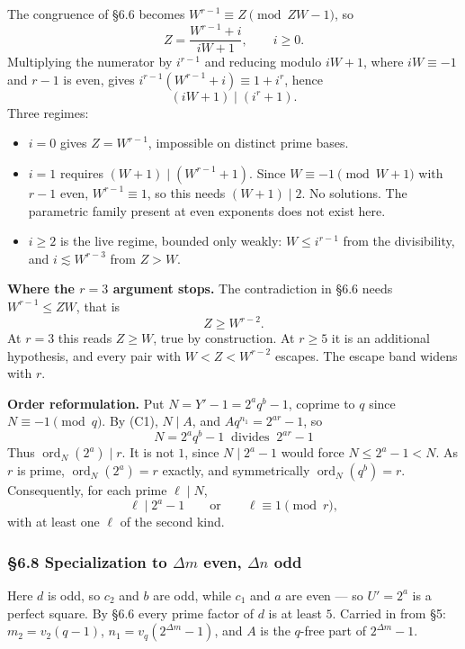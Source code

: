 \documentclass[11pt]{article}
\begin{document}
The congruence of \S6.6 becomes $W^{r-1} \equiv Z \pmod{ZW-1}$, so
\[
Z = \frac{W^{r-1}+i}{iW+1}, \qquad i \geq 0 .
\]
Multiplying the numerator by $i^{r-1}$ and reducing modulo $iW+1$, where $iW \equiv -1$ and $r-1$ is even, gives $i^{r-1}\left(W^{r-1}+i\right) \equiv 1 + i^{r}$, hence
\[
(iW+1) \mid \left(i^{r}+1\right).
\]
Three regimes:
\begin{itemize}
\item $i = 0$ gives $Z = W^{r-1}$, impossible on distinct prime bases.
\item $i = 1$ requires $(W+1) \mid \left(W^{r-1}+1\right)$. Since $W \equiv -1 \pmod{W+1}$ with $r-1$ even, $W^{r-1} \equiv 1$, so this needs $(W+1) \mid 2$. No solutions. The parametric family present at even exponents does not exist here.
\item $i \geq 2$ is the live regime, bounded only weakly: $W \leq i^{r-1}$ from the divisibility, and $i \lesssim W^{r-3}$ from $Z > W$.
\end{itemize}

\medskip
\noindent\textbf{Where the $r=3$ argument stops.} The contradiction in \S6.6 needs $W^{r-1} \leq ZW$, that is
\[
Z \geq W^{r-2} .
\]
At $r=3$ this reads $Z \geq W$, true by construction. At $r \geq 5$ it is an additional hypothesis, and every pair with $W < Z < W^{r-2}$ escapes. The escape band widens with $r$.

\medskip
\noindent\textbf{Order reformulation.} Put $N = Y'-1 = 2^{a}q^{b}-1$, coprime to $q$ since $N \equiv -1 \pmod q$. By (C1), $N \mid A$, and $A q^{n_1} = 2^{ar}-1$, so
\[
\boxed{\,N = 2^{a}q^{b}-1 \ \text{ divides } \ 2^{ar}-1\,}
\]
Thus $\operatorname{ord}_N(2^{a}) \mid r$. It is not $1$, since $N \mid 2^a-1$ would force $N \leq 2^a - 1 < N$. As $r$ is prime, $\operatorname{ord}_N(2^{a}) = r$ exactly, and symmetrically $\operatorname{ord}_N(q^{b}) = r$. Consequently, for each prime $\ell \mid N$,
\[
\ell \mid 2^{a}-1 \qquad\text{or}\qquad \ell \equiv 1 \pmod r,
\]
with at least one $\ell$ of the second kind.

\subsubsection*{\S6.8 Specialization to $\Delta m$ even, $\Delta n$ odd}

Here $d$ is odd, so $c_2$ and $b$ are odd, while $c_1$ and $a$ are even --- so $U' = 2^{a}$ is a perfect square. By \S6.6 every prime factor of $d$ is at least $5$. Carried in from \S5: $m_2 = v_2(q-1)$, $n_1 = v_q\!\left(2^{\Delta m}-1\right)$, and $A$ is the $q$-free part of $2^{\Delta m}-1$.
\end{document}
